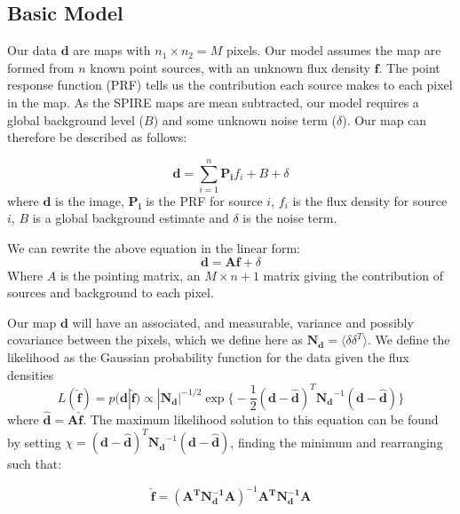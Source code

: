 \documentclass[useAMS,usenatbib]{mn2e}
\begin{document}
\subsection{Basic Model}
Our data $\mathbf{d}$ are maps with $n_1 \times n_2 = M$ pixels. Our model assumes the map are formed from $n$ known point sources, with an unknown flux density $\mathbf{f}$. The point response function (PRF) tells us the contribution each source makes to each pixel in the map. As the SPIRE maps are mean subtracted, our model requires a global background level ($B$) and some unknown noise term ($\delta$). Our map can therefore be described as follows:

\begin{equation}
\mathbf{d} = \sum\limits_{i=1}^n \mathbf{P_i}f_i + B + \delta
\label{eq:map}
\end{equation}
where $\mathbf{d}$ is the image, $\mathbf{P_i}$ is the PRF for source $i$, $f_i$ is the flux density for source $i$, $B$ is a global background estimate and $\delta$ is the noise term.

We can rewrite the above equation in the linear form:
\begin{equation}
\mathbf{d} = \mathbf{Af} + \delta
\label{eq:map2}
\end{equation}
Where $A$ is the pointing matrix, an $M \times n+1$ matrix giving the contribution of sources and background to each pixel.

Our map $\mathbf{d}$ will have an associated, and measurable, variance and possibly covariance between the pixels, which we define here as $\mathbf{N_d} = \langle\delta\delta^T\rangle$. We define the likelihood as the Gaussian probability function for the data given the flux densities
\begin{equation}
L(\hat{\mathbf{f}}) = p(\mathbf{d}|\hat{\mathbf{f}}) \propto |\mathbf{N_d}|^{-1/2} \exp\big\{ -\frac{1}{2}(\mathbf{d}-\hat{\mathbf{d}})^T\mathbf{N_d}^{-1}(\mathbf{d}-\hat{\mathbf{d}})\big\}\label{eq:likelihood}
\end{equation}
where $\hat{\mathbf{d}}=\mathbf{A\hat{f}}$. The maximum likelihood solution to this equation can be found by setting $\chi = (\mathbf{d}-\hat{\mathbf{d}})^T\mathbf{N_d}^{-1}(\mathbf{d}-\hat{\mathbf{d}})$, finding the minimum and rearranging such that:

\begin{equation}
\hat{\mathbf{f}}=(\mathbf{A^TN_d^{-1}A})^{-1}\mathbf{A^TN_d^{-1}A}\label{eq:mlm}
\end{equation}
\end{document}
